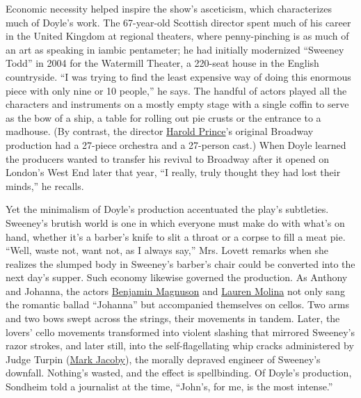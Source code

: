 Economic necessity helped inspire the show's asceticism, which
characterizes much of Doyle's work. The 67-year-old Scottish director
spent much of his career in the United Kingdom at regional theaters,
where penny-pinching is as much of an art as speaking in iambic
pentameter; he had initially modernized ``Sweeney Todd'' in 2004 for the
Watermill Theater, a 220-seat house in the English countryside. ``I was
trying to find the least expensive way of doing this enormous piece with
only nine or 10 people,'' he says. The handful of actors played all the
characters and instruments on a mostly empty stage with a single coffin
to serve as the bow of a ship, a table for rolling out pie crusts or the
entrance to a madhouse. (By contrast, the director
\href{https://www.nytimes.com/2019/07/31/theater/hal-prince-dead.html}{Harold
Prince}'s original Broadway production had a 27-piece orchestra and a
27-person cast.) When Doyle learned the producers wanted to transfer his
revival to Broadway after it opened on London's West End later that
year, ``I really, truly thought they had lost their minds,'' he recalls.

Yet the minimalism of Doyle's production accentuated the play's
subtleties. Sweeney's brutish world is one in which everyone must make
do with what's on hand, whether it's a barber's knife to slit a throat
or a corpse to fill a meat pie. ``Well, waste not, want not, as I always
say,'' Mrs. Lovett remarks when she realizes the slumped body in
Sweeney's barber's chair could be converted into the next day's supper.
Such economy likewise governed the production. As Anthony and Johanna,
the actors \href{https://www.imdb.com/name/nm3735219/}{Benjamin
Magnuson} and \href{http://laurenmolina.com/}{Lauren Molina} not only
sang the romantic ballad ``Johanna'' but accompanied themselves on
cellos. Two arms and two bows swept across the strings, their movements
in tandem. Later, the lovers' cello movements transformed into violent
slashing that mirrored Sweeney's razor strokes, and later still, into
the self-flagellating whip cracks administered by Judge Turpin
(\href{https://www.imdb.com/name/nm0415002/}{Mark Jacoby}), the morally
depraved engineer of Sweeney's downfall. Nothing's wasted, and the
effect is spellbinding. Of Doyle's production, Sondheim told a
journalist at the time, ``John's, for me, is the most intense.''

